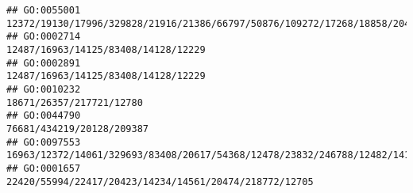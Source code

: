 \documentclass[
]{article}
\begin{document}
\begin{verbatim}
## GO:0055001                                                                                                                                                                                                                                                                                                                 12372/19130/17996/329828/21916/21386/66797/50876/109272/17268/18858/20474/65256/18092/225288
## GO:0002714                                                                                                                                                                                                                                                                                                                                                                          12487/16963/14125/83408/14128/12229
## GO:0002891                                                                                                                                                                                                                                                                                                                                                                          12487/16963/14125/83408/14128/12229
## GO:0010232                                                                                                                                                                                                                                                                                                                                                                                     18671/26357/217721/12780
## GO:0044790                                                                                                                                                                                                                                                                                                                                                                                    76681/434219/20128/209387
## GO:0097553                                                                                                                                                                                                                                                                                                                              16963/12372/14061/329693/83408/20617/54368/12478/23832/246788/12482/14126/12766
## GO:0001657                                                                                                                                                                                                                                                                                                                                                       22420/55994/22417/20423/14234/14561/20474/218772/12705

\end{verbatim}
\end{document}
